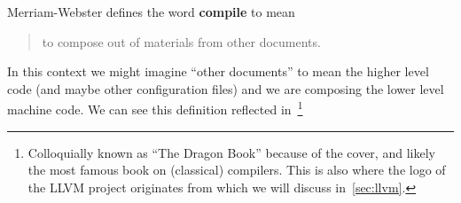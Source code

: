 Merriam-Webster defines the word \textbf{compile} to mean~\cite{compiledef}
\begin{quote}
    to compose out of materials from other documents.
\end{quote}
In this context we might imagine ``other documents'' to mean the higher level code (and maybe other configuration files) and we are composing the lower level machine code.
We can see this definition reflected in~\footnote{Colloquially known as ``The Dragon Book'' because of the cover, and likely the most famous book on (classical) compilers. This is also where the logo of the LLVM project originates from which we will discuss in~\cref{sec:llvm}.}
